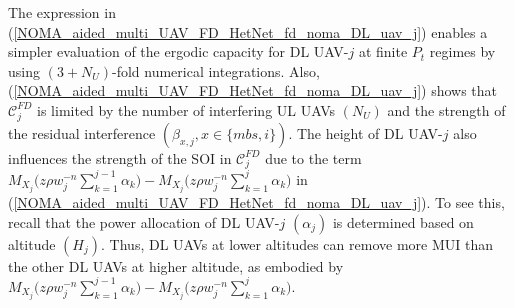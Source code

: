 The expression in (\ref{NOMA_aided_multi_UAV_FD_HetNet_fd_noma_DL_uav_j}) enables a simpler evaluation of the ergodic capacity for DL UAV-$j$ at finite $P_t$ regimes by using $(3 + N_U)$-fold numerical integrations. Also, (\ref{NOMA_aided_multi_UAV_FD_HetNet_fd_noma_DL_uav_j}) shows that $\mathcal{C}_{j}^{FD}$ is limited by the number of interfering UL UAVs $(N_U)$ and the strength of the residual interference $(\beta_{x,j}, x \in \{mbs,i\})$. The height of DL UAV-$j$ also influences the strength of the SOI in $\mathcal{C}_{j}^{FD}$ due to the term $M_{X_j}\Big(z \rho w_j^{-n} \sum_{k=1}^{j-1}\alpha_k \Big) - M_{X_j}\Big(z \rho w_j^{-n} \sum_{k=1}^{j}\alpha_k\Big)$ in (\ref{NOMA_aided_multi_UAV_FD_HetNet_fd_noma_DL_uav_j}). To see this, recall that the power allocation of DL UAV-$j$ $(\alpha_j)$ is determined based on altitude $(H_j)$. Thus, DL UAVs at lower altitudes can remove more MUI than the other DL UAVs at higher altitude, as embodied by $M_{X_j}\Big(z \rho w_j^{-n} \sum_{k=1}^{j-1}\alpha_k \Big) - M_{X_j}\Big(z \rho w_j^{-n} \sum_{k=1}^{j}\alpha_k\Big)$.

